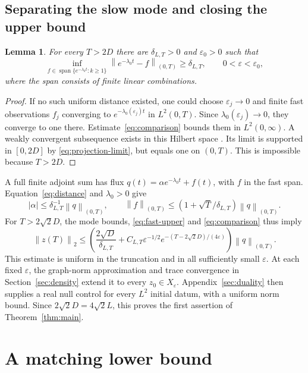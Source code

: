 \documentclass[11pt]{article}
\numberwithin{equation}{section}
\newtheorem{lemma}[theorem]{Lemma}
\newcommand{\eps}{\varepsilon}
\newcommand{\Span}{\operatorname{span}}
\newcommand{\norm}[1]{\left\|#1\right\|}
\begin{document}
\subsection{Separating the slow mode and closing the upper bound}

\begin{lemma}\label{lem:distance}
For every $T>2D$ there are $\delta_{L,T}>0$ and $\eps_0>0$ such that
\begin{equation}\label{eq:distance}
 \inf_{f\in\Span\{e^{-\lambda_kt}:k\ge1\}}
       \norm{e^{-\lambda_0t}-f}_{(0,T)}\ge\delta_{L,T},
       \qquad 0<\eps<\eps_0,
\end{equation}
where the span consists of finite linear combinations.
\end{lemma}
\begin{proof}
If no such uniform distance existed, one could choose $\eps_j\to0$
and finite fast observations $f_j$ converging to
$e^{-\lambda_0(\eps_j)t}$ in $L^2(0,T)$.
Since $\lambda_0(\eps_j)\to0$, they converge to one there.
Estimate~\eqref{eq:comparison} bounds them in $L^2(0,\infty)$.
A weakly convergent subsequence exists in this Hilbert space
\cite[Lemma 1.13]{Teschl}.
Its limit is supported in $[0,2D]$ by
\eqref{eq:projection-limit}, but equals one on $(0,T)$.
This is impossible because $T>2D$.
\end{proof}

A full finite adjoint sum has flux
$q(t)=\alpha e^{-\lambda_0t}+f(t)$, with $f$ in the fast span.
Equation~\eqref{eq:distance} and $\lambda_0>0$ give
\[
 |\alpha|\le\delta_{L,T}^{-1}\norm q_{(0,T)},\qquad
 \norm f_{(0,T)}\le(1+\sqrt T/\delta_{L,T})\norm q_{(0,T)}.
\]
For $T>2\sqrt2D$, the mode bounds, \eqref{eq:fast-upper} and
\eqref{eq:comparison} thus imply
\begin{equation}\label{eq:observation}
 \norm{z(T)}_2\le
 \left(\frac{2\sqrt D}{\delta_{L,T}}+
       C_{L,T}\eps^{-1/2}e^{-(T-2\sqrt2D)/(4\eps)}\right)
                    \norm q_{(0,T)}.
\end{equation}
This estimate is uniform in the truncation and in all sufficiently small
$\eps$. At each fixed $\eps$, the graph-norm approximation and trace
convergence in Section~\ref{sec:density} extend it to every
$z_0\in X_\eps$. Appendix~\ref{sec:duality} then supplies a real null
control for every $L^2$ initial datum, with a uniform norm bound.
Since $2\sqrt2D=4\sqrt2L$, this proves the first assertion of
Theorem~\ref{thm:main}.

\section{A matching lower bound}\label{sec:lower}
\end{document}
